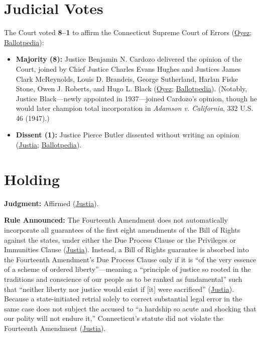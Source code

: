 \documentclass[12pt]{article}
\begin{document}
\section{Judicial Votes}

The Court voted \textbf{8--1} to affirm the Connecticut Supreme Court of Errors (\href{https://www.oyez.org/cases/1900-1940/302us319}{Oyez}; \href{https://ballotpedia.org/Palko_v._Connecticut}{Ballotpedia}):
\begin{itemize}
    \item \textbf{Majority (8):} Justice Benjamin N. Cardozo delivered the opinion of the Court, joined by Chief Justice Charles Evans Hughes and Justices James Clark McReynolds, Louis D. Brandeis, George Sutherland, Harlan Fiske Stone, Owen J. Roberts, and Hugo L. Black (\href{https://www.oyez.org/cases/1900-1940/302us319}{Oyez}; \href{https://ballotpedia.org/Palko_v._Connecticut}{Ballotpedia}). (Notably, Justice Black---newly appointed in 1937---joined Cardozo's opinion, though he would later champion total incorporation in \textit{Adamson v. California}, 332 U.S. 46 (1947).)
    \item \textbf{Dissent (1):} Justice Pierce Butler dissented without writing an opinion (\href{https://supreme.justia.com/cases/federal/us/302/319/}{Justia}; \href{https://ballotpedia.org/Palko_v._Connecticut}{Ballotpedia}).
\end{itemize}

\section{Holding}

\textbf{Judgment:} Affirmed (\href{https://supreme.justia.com/cases/federal/us/302/319/}{Justia}).

\textbf{Rule Announced:} The Fourteenth Amendment does not automatically incorporate all guarantees of the first eight amendments of the Bill of Rights against the states, under either the Due Process Clause or the Privileges or Immunities Clause (\href{https://supreme.justia.com/cases/federal/us/302/319/}{Justia}). Instead, a Bill of Rights guarantee is absorbed into the Fourteenth Amendment's Due Process Clause only if it is ``of the very essence of a scheme of ordered liberty''---meaning a ``principle of justice so rooted in the traditions and conscience of our people as to be ranked as fundamental'' such that ``neither liberty nor justice would exist if [it] were sacrificed'' (\href{https://supreme.justia.com/cases/federal/us/302/319/}{Justia}). Because a state-initiated retrial solely to correct substantial legal error in the same case does not subject the accused to ``a hardship so acute and shocking that our polity will not endure it,'' Connecticut's statute did not violate the Fourteenth Amendment (\href{https://supreme.justia.com/cases/federal/us/302/319/}{Justia}).
\end{document}

